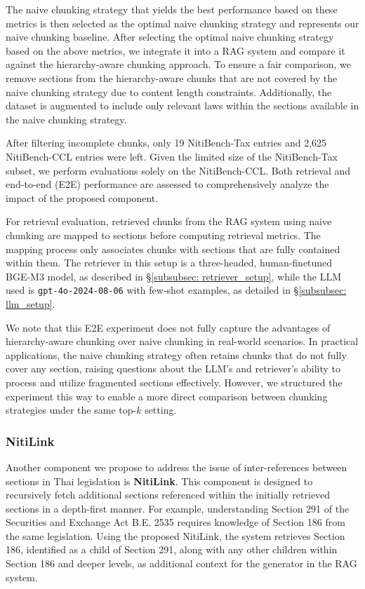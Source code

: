 The naive chunking strategy that yields the best performance based on these metrics is then selected as the optimal naive chunking strategy and represents our naive chunking baseline.
%
After selecting the optimal naive chunking strategy based on the above metrics, we integrate it into a RAG system and compare it against the hierarchy-aware chunking approach. 
%
To ensure a fair comparison, we remove sections from the hierarchy-aware chunks that are not covered by the naive chunking strategy due to content length constraints.
%
Additionally, the dataset is augmented to include only relevant laws within the sections available in the naive chunking strategy.  

After filtering incomplete chunks, only 19 NitiBench-Tax entries and 2,625 NitiBench-CCL entries were left.
%
Given the limited size of the NitiBench-Tax subset, we perform evaluations solely on the NitiBench-CCL. 
%
Both retrieval and end-to-end (E2E) performance are assessed to comprehensively analyze the impact of the proposed component.

For retrieval evaluation, retrieved chunks from the RAG system using naive chunking are mapped to sections before computing retrieval metrics. 
%
The mapping process only associates chunks with sections that are fully contained within them. 
%
The retriever in this setup is a three-headed, human-finetuned BGE-M3 model, as described in \S\ref{subsubsec: retriever_setup}, while the LLM used is \texttt{gpt-4o-2024-08-06} with few-shot examples, as detailed in \S\ref{subsubsec: llm_setup}.

We note that this E2E experiment does not fully capture the advantages of hierarchy-aware chunking over naive chunking in real-world scenarios. 
%
In practical applications, the naive chunking strategy often retains chunks that do not fully cover any section, raising questions about the LLM's and retriever's ability to process and utilize fragmented sections effectively.
%
However, we structured the experiment this way to enable a more direct comparison between chunking strategies under the same top-$k$ setting.

\subsubsection{NitiLink}
\label{subsubsec: referencer_setup}

Another component we propose to address the issue of inter-references between sections in Thai legislation is \textbf{NitiLink}. 
%
This component is designed to recursively fetch additional sections referenced within the initially retrieved sections in a depth-first manner. 
%
For example, understanding Section 291 of the Securities and Exchange Act B.E. 2535 requires knowledge of Section 186 from the same legislation. 
%
Using the proposed NitiLink, the system retrieves Section 186, identified as a child of Section 291, along with any other children within Section 186 and deeper levels, as additional context for the generator in the RAG system.

